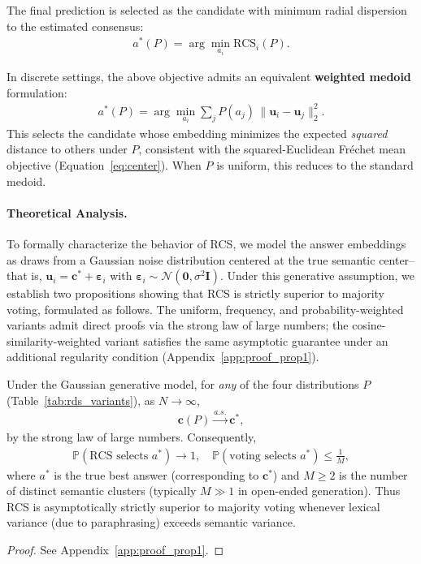 The final prediction is selected as the candidate with minimum radial dispersion to the estimated consensus:
\begin{align}
    a^*(P) = \arg\min_{a_i} \mathrm{RCS}_i(P).
\end{align}

In discrete settings, the above objective admits an equivalent \textbf{weighted medoid} formulation:
\begin{align}
    a^*(P) = \arg\min_{a_i} \sum_{j} P(a_j)\,\|\mathbf{u}_i - \mathbf{u}_j\|_2^2.
\end{align}
This selects the candidate whose embedding minimizes the expected \emph{squared} distance to others under $P$, consistent with the squared-Euclidean Fréchet mean objective (Equation~\ref{eq:center}). When $P$ is uniform, this reduces to the standard medoid.


\paragraph{Theoretical Analysis.}
To formally characterize the behavior of RCS, we model the answer embeddings as draws from a Gaussian noise distribution centered at the true semantic center--that is, $\mathbf{u}_i = \mathbf{c}^* + \boldsymbol{\varepsilon}_i$ with $\boldsymbol{\varepsilon}_i \sim \mathcal{N}(\mathbf{0}, \sigma^2\mathbf{I})$. 
Under this generative assumption, we establish two propositions showing that RCS is strictly superior to majority voting, formulated as follows. The uniform, frequency, and probability-weighted variants admit direct proofs via the strong law of large numbers; the cosine-similarity-weighted variant satisfies the same asymptotic guarantee under an additional regularity condition (Appendix~\ref{app:proof_prop1}).

\begin{prop}
Under the Gaussian generative model, for \emph{any} of the four distributions \(P\) (Table~\ref{tab:rds_variants}), as \(N \to \infty\),
\begin{align}
\mathbf{c}(P) \xrightarrow{a.s.} \mathbf{c}^*,
\end{align}
by the strong law of large numbers. Consequently,
\begin{align}
\mathbb{P}(\text{RCS selects $a^*$}) \to 1, \quad \mathbb{P}(\text{voting selects $a^*$}) \leq \frac{1}{M},
\end{align}
where $a^*$ is the true best answer (corresponding to $\mathbf{c}^*$) and \(M \geq 2\) is the number of distinct semantic clusters (typically \(M \gg 1\) in open-ended generation). Thus RCS is asymptotically strictly superior to majority voting whenever lexical variance (due to paraphrasing) exceeds semantic variance.
\end{prop}
\begin{proof}
    See Appendix~\ref{app:proof_prop1}.
\end{proof}

